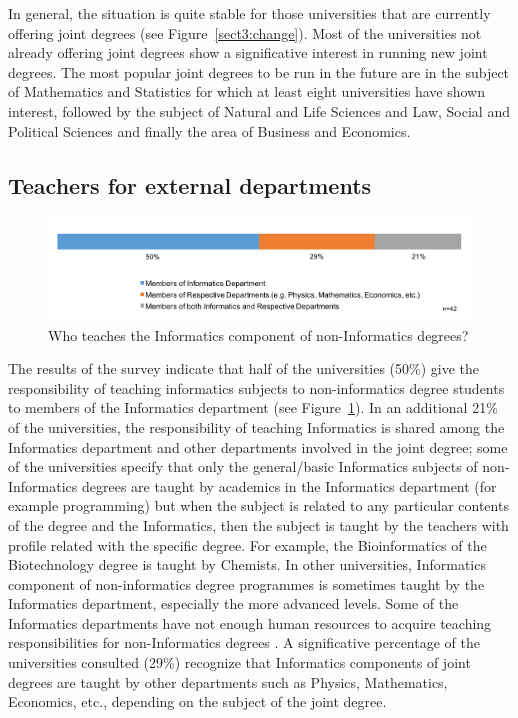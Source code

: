 In general, the situation is  quite stable for those universities that are currently offering joint degrees (see Figure~\ref{sect3:change}). Most of the universities not already offering joint degrees show a significative interest in running new joint degrees. The most popular joint degrees to be run in the future are in the subject of Mathematics and Statistics for which at least eight universities have shown interest, followed by the subject of 
Natural and Life Sciences  and 
Law, Social and Political Sciences and finally the area of  Business and Economics. 

\subsection{Teachers for external departments}
\begin{figure}[h]
\includegraphics[width = \linewidth]{charts/2c.png}
\caption{Who teaches the Informatics component of non-Informatics degrees?}
\label{sect3:teachers}
\end{figure}

The results of the survey indicate that half of the universities (50\%) give the responsibility of teaching informatics subjects to non-informatics degree students to members of the Informatics department (see Figure~\ref{sect3:teachers}). In an additional 21\% of the universities, the responsibility of teaching Informatics is shared among the Informatics department and other departments involved in the joint degree; some of the universities specify that only the general/basic Informatics subjects of non-Informatics degrees are taught by academics in the Informatics department (for example programming) but when the subject is related to any particular contents of the degree and the Informatics, then the subject is taught by the teachers with profile related with the specific degree. For example, the Bioinformatics of the Biotechnology degree is taught by Chemists. In other universities, Informatics component of non-informatics degree programmes is sometimes taught by the Informatics department, especially the more advanced levels. Some of the Informatics departments have not enough human resources to acquire teaching responsibilities  for non-Informatics degrees . A significative percentage of the universities consulted (29\%) recognize that Informatics components of joint degrees are taught by other departments such as Physics, Mathematics, Economics, etc., depending on the subject of the joint degree.

